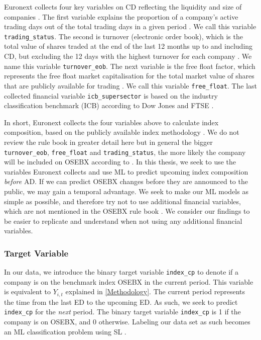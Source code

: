 Euronext collects four key variables on CD reflecting the liquidity and size of companies \parencite{oslo-stock-exchange-news-web}. The first variable explains the proportion of a company's active trading days out of the total trading days in a given period \parencite*{OSEBX-rule-book}. We call this variable \texttt{trading\_status}. The second is turnover (electronic order book), which is the total value of shares traded at the end of the last 12 months up to and including CD, but excluding the 12 days with the highest turnover for each company \parencite*{OSEBX-rule-book}. We name this variable \texttt{turnover\_eob}. The next variable is the free float factor, which represents the free float market capitalisation for the total market value of shares that are publicly available for trading \parencite*{OSEBX-rule-book}. We call this variable \texttt{free\_float}. The last collected financial variable \texttt{icb\_supersector} is based on the industry classification benchmark (ICB) according to Dow Jones and FTSE \parencite{industry-classification-benchmark}. 

In short, Euronext collects the four variables above to calculate index composition, based on the publicly available index methodology \parencite{OSEBX-rule-book}. We do not review the rule book in greater detail here but in general the bigger \texttt{turnover\_eob}, \texttt{free\_float} and \texttt{trading\_status}, the more likely the company will be included on OSEBX according to \textcite{OSEBX-rule-book}. In this thesis, we seek to use the variables Euronext collects and use ML to predict upcoming index composition \textit{before} AD. If we can predict OSEBX changes before they are announced to the public, we may gain a temporal advantage. We seek to make our ML models as simple as possible, and therefore try not to use additional financial variables, which are not mentioned in the OSEBX rule book \parencite{OSEBX-rule-book}. We consider our findings to be easier to replicate and understand when not using any additional financial variables.


\subsubsection{Target Variable}

In our data, we introduce the binary target variable \texttt{index\_cp} to denote if a company is on the benchmark index OSEBX in the current period. This variable is equivalent to $Y_{i,t}$ explained in \autoref{Methodology}. The current period represents the time from the last ED to the upcoming ED. As such, we seek to predict \texttt{index\_cp} for the \textit{next} period. The binary target variable \texttt{index\_cp} is 1 if the company is on OSEBX, and 0 otherwise. Labeling our data set as such becomes an ML classification problem using SL \parencite{ban404-the-elements-of-statistical-learning}.

